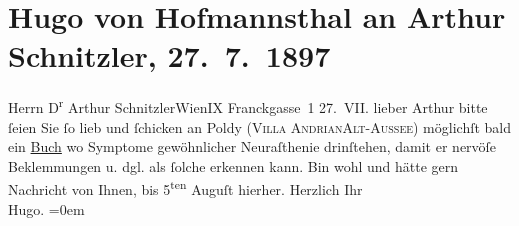 

         
         \renewcommand{\erwaehntePersonen}{Personen: Leopold von Andrian-Werburg}
         \renewcommand{\erwaehnteOrte}{Orte: Altaussee, Bad Fusch, Frankgasse 1, Villa Andrian, Wien}
         \renewcommand{\erwaehnteWerke}{}
               \section[Hugo von Hofmannsthal an Arthur Schnitzler, 27. 7. 1897]{ Hugo von Hofmannsthal an Arthur Schnitzler, 27. 7. 1897}\nopagebreak{}\rehead{ }\begin{ledgroupsized}[t]{13cm}\normalsize\beginnumbering \toendnotes[C]{\smallbreak\pagebreak[2]} 
\pstart{}{\pb}Herrn D\textsuperscript{r} Arthur Schnitzler\pend{}\pstart{}Wien\pend{}\pstart{}IX Franckgasse 1\pend{}{\bigskip}\pstart
           \raggedleft{}{\pb}27. VII.\pend
           \pstart{}lieber Arthur\pend\pstart
           bitte ſeien Sie ſo lieb und ſchicken an Poldy
                  (\textsc{Villa Andrian}\textsc{Alt-Aussee}) möglichſt bald ein \uline{Buch} wo Symptome
               gewöhnlicher Neuraſthenie drinſtehen, damit er nervöſe Beklemmungen u. dgl. als
               ſolche erkennen kann.\pend
           \pstart
           Bin wohl und hätte gern Nachricht von Ihnen, bis 5\textsuperscript{ten} Auguſt hierher.\pend
           \pstart
           Herzlich Ihr{\\[\baselineskip]}\spacefill\mbox{Hugo.}\pend
           \leftskip=0em{}
         
         \endnumbering{}\end{ledgroupsized}  \newcommand{\dateiname}{L00711}\newcommand{\titel}{Hugo von Hofmannsthal an Arthur Schnitzler, 27. 7. 1897}\newcommand{\editorInnen}{Martin Anton Müller und Gerd-Hermann Susen}
      